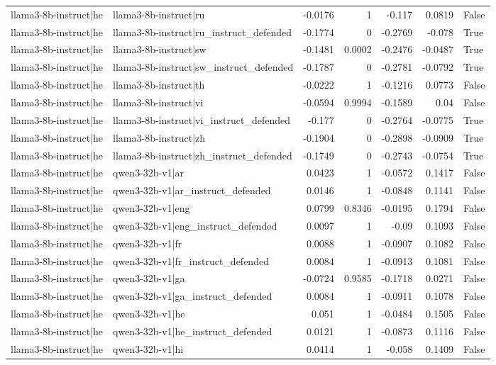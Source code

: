 \begin{table}
\begin{tabular}{l l r r r r l}
llama3-8b-instruct|he & llama3-8b-instruct|ru & -0.0176 & 1 & -0.117 & 0.0819 & False \\
llama3-8b-instruct|he & llama3-8b-instruct|ru_instruct_defended & -0.1774 & 0 & -0.2769 & -0.078 & True \\
llama3-8b-instruct|he & llama3-8b-instruct|sw & -0.1481 & 0.0002 & -0.2476 & -0.0487 & True \\
llama3-8b-instruct|he & llama3-8b-instruct|sw_instruct_defended & -0.1787 & 0 & -0.2781 & -0.0792 & True \\
llama3-8b-instruct|he & llama3-8b-instruct|th & -0.0222 & 1 & -0.1216 & 0.0773 & False \\
llama3-8b-instruct|he & llama3-8b-instruct|vi & -0.0594 & 0.9994 & -0.1589 & 0.04 & False \\
llama3-8b-instruct|he & llama3-8b-instruct|vi_instruct_defended & -0.177 & 0 & -0.2764 & -0.0775 & True \\
llama3-8b-instruct|he & llama3-8b-instruct|zh & -0.1904 & 0 & -0.2898 & -0.0909 & True \\
llama3-8b-instruct|he & llama3-8b-instruct|zh_instruct_defended & -0.1749 & 0 & -0.2743 & -0.0754 & True \\
llama3-8b-instruct|he & qwen3-32b-v1|ar & 0.0423 & 1 & -0.0572 & 0.1417 & False \\
llama3-8b-instruct|he & qwen3-32b-v1|ar_instruct_defended & 0.0146 & 1 & -0.0848 & 0.1141 & False \\
llama3-8b-instruct|he & qwen3-32b-v1|eng & 0.0799 & 0.8346 & -0.0195 & 0.1794 & False \\
llama3-8b-instruct|he & qwen3-32b-v1|eng_instruct_defended & 0.0097 & 1 & -0.09 & 0.1093 & False \\
llama3-8b-instruct|he & qwen3-32b-v1|fr & 0.0088 & 1 & -0.0907 & 0.1082 & False \\
llama3-8b-instruct|he & qwen3-32b-v1|fr_instruct_defended & 0.0084 & 1 & -0.0913 & 0.1081 & False \\
llama3-8b-instruct|he & qwen3-32b-v1|ga & -0.0724 & 0.9585 & -0.1718 & 0.0271 & False \\
llama3-8b-instruct|he & qwen3-32b-v1|ga_instruct_defended & 0.0084 & 1 & -0.0911 & 0.1078 & False \\
llama3-8b-instruct|he & qwen3-32b-v1|he & 0.051 & 1 & -0.0484 & 0.1505 & False \\
llama3-8b-instruct|he & qwen3-32b-v1|he_instruct_defended & 0.0121 & 1 & -0.0873 & 0.1116 & False \\
llama3-8b-instruct|he & qwen3-32b-v1|hi & 0.0414 & 1 & -0.058 & 0.1409 & False \\

\end{tabular}
\end{table}
